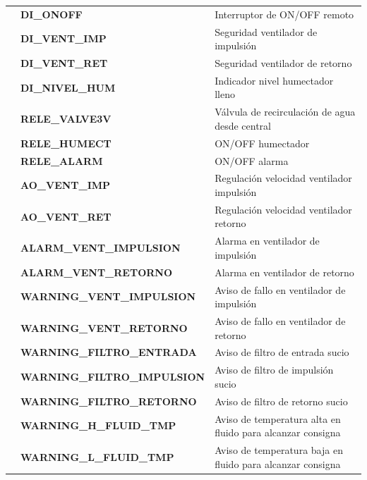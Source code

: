 \begin{center}
\begin{longtable}{|p{2.2cm}|p{5.3cm}|p{7cm}|}
        \centering{Entradas} & \small\centering\textbf{DI\_ONOFF} & \small{Interruptor de ON/OFF remoto} \\ \cline{2-3}
        \centering{digitales} & \small\centering\textbf{DI\_VENT\_IMP} & \small{Seguridad ventilador de impulsión} \\ \cline{2-3}
        & \small\centering\textbf{DI\_VENT\_RET} & \small{Seguridad ventilador de retorno} \\ \cline{2-3}
        & \small\centering\textbf{DI\_NIVEL\_HUM} & \small{Indicador nivel humectador lleno} \\ \hline

        \centering{Salidas} & \small\centering\textbf{RELE\_VALVE3V} & \small{Válvula de recirculación de agua desde central} \\ \cline{2-3}
        \centering{digitales} & \small\centering\textbf{RELE\_HUMECT} & \small{ON/OFF humectador} \\ \cline{2-3}
        & \small\centering\textbf{RELE\_ALARM} & \small{ON/OFF alarma} \\ \hline

        \centering{Salidas} & \small\centering\textbf{AO\_VENT\_IMP} & \small{Regulación velocidad ventilador impulsión} \\ \cline{2-3}
        \centering{analógicas} & \small\centering\textbf{AO\_VENT\_RET} & \small{Regulación velocidad ventilador retorno} \\ \hline

        \centering{Alarmas} & \small\centering\textbf{ALARM\_VENT\_IMPULSION} & \small{Alarma en ventilador de impulsión} \\ \cline{2-3}
        & \small\centering\textbf{ALARM\_VENT\_RETORNO} & \small{Alarma en ventilador de retorno} \\ \hline

        \centering{Warnings} & \footnotesize\centering\textbf{WARNING\_VENT\_IMPULSION} & \small{Aviso de fallo en ventilador de impulsión} \\ \cline{2-3}
        & \footnotesize\centering\textbf{WARNING\_VENT\_RETORNO} & \small{Aviso de fallo en ventilador de retorno} \\ \cline{2-3}
        & \footnotesize\centering\textbf{WARNING\_FILTRO\_ENTRADA} & \small{Aviso de filtro de entrada sucio} \\ \cline{2-3}
        & \footnotesize\centering\textbf{WARNING\_FILTRO\_IMPULSION} & \small{Aviso de filtro de impulsión sucio} \\ \cline{2-3}
        & \footnotesize\centering\textbf{WARNING\_FILTRO\_RETORNO} & \small{Aviso de filtro de retorno sucio} \\ \cline{2-3}
        & \small\centering\textbf{WARNING\_H\_FLUID\_TMP} & \small{Aviso de temperatura alta en fluido para alcanzar consigna} \\ \cline{2-3}
        & \small\centering\textbf{WARNING\_L\_FLUID\_TMP} & \small{Aviso de temperatura baja en fluido para alcanzar consigna} \\ \hline
    \end{longtable}
\end{center} 

